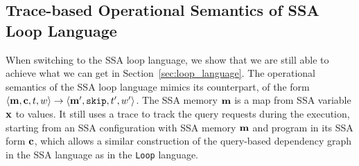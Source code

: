 
\subsection{Trace-based Operational Semantics of SSA Loop Language}
When switching to the SSA loop language, we show that we are still able to achieve what we can get in Section~\ref{sec:loop_language}. The operational semantics of the SSA loop language mimics its counterpart, of the form $\langle {\bf{{m}}}, {\bf{{c}}}, t, w \rangle \to \langle {\bf{{m'}}}, \mathtt{skip}, t', w' \rangle$. The SSA memory ${\bf{{m}}}$ is a map from SSA variable ${\bf{{x}}}$ to values. It still uses a trace to track the query requests during the execution, starting from an SSA configuration with SSA memory ${\bf{{m}}}$ and program in its SSA form ${\bf{{c}}}$, which allows a similar construction of the query-based dependency graph in the SSA language as in the {\tt Loop} language.

